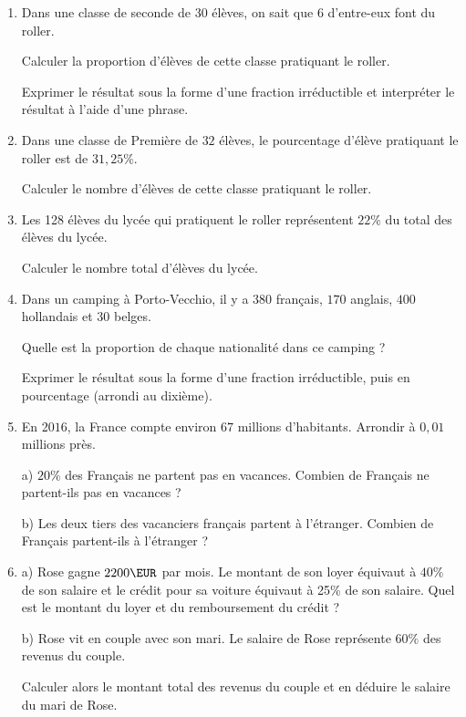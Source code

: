 
\exo

\begin{enumerate}


\item Dans une classe de seconde de 30 élèves, on sait que 6 d'entre-eux font du roller.
\

Calculer la proportion d'élèves de cette classe pratiquant le roller.
\

Exprimer le résultat sous la forme d'une fraction irréductible et interpréter le résultat à l'aide d'une phrase.


\item  Dans une classe de Première de $32$ élèves, le pourcentage d'élève pratiquant le roller est de $31,25 \%$.
\

Calculer le nombre d'élèves de cette classe pratiquant le roller.

\item Les 128 élèves du lycée qui pratiquent le roller représentent $22 \%$ du total des élèves du lycée.
\

Calculer le nombre total d'élèves du lycée.

\item Dans un camping à Porto-Vecchio, il y a $380$ français, $170$ anglais, $400$ hollandais et $30$ belges.

Quelle est la proportion de chaque nationalité dans ce camping ? 

Exprimer le résultat sous la forme d'une fraction irréductible, puis en pourcentage (arrondi au dixième).

\item En 2$016$, la France compte environ $67$ millions d'habitants. Arrondir à $0,01$ millions près.

a) $20\%$ des Français ne partent pas en vacances. Combien de Français ne partent-ils pas en vacances ?

b) Les deux tiers des vacanciers français partent à l'étranger. Combien de Français partent-ils à l'étranger ?

\item a) Rose gagne $2200 \EUR$ par mois. Le montant de son loyer équivaut à $40\%$ de son salaire et le crédit pour sa voiture équivaut à 25\% de son salaire. Quel est le montant du loyer et du remboursement du crédit ?

b) Rose vit en couple avec son mari. Le salaire de Rose représente $60\%$ des revenus du couple.

Calculer alors le montant total des revenus du couple et en déduire le salaire du mari de Rose.


\end{enumerate}

